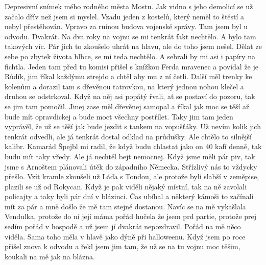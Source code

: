 
Depresivní snímek mého rodného města Mostu. Jak vidno s jeho demolicí
se už začalo dřív než jsem si myslel. Vzadu jeden z kostelů, který
neměl to štěstí a nebyl přestěhován. Vpravo za ruinou budova vojenské
správy. Tam jsem byl u odvodu. Dvakrát. Na dva roky na vojnu se mi
tenkrát fakt nechtělo. A bylo tam takových víc. Pár jich to zkoušelo
uhrát na hlavu, ale do toho jsem nešel. Dělat ze sebe po zbytek života
blbce, se mi teda nechtělo. A sebrali by mi asi i papíry na fichtla.
Jeden tam před tu komisi přišel s knížkou Ferda mravenec a povídal že
je Růdík, jim říkal každýmu strejdo a chtěl aby mu z ní četli. Další
měl trenky ke kolenům a dorazil tam s dřevěnou tatrovkou, na který
jednou nohou klečel a druhou se odstrkoval. Když na něj asi popátý
řvali, ať se postaví do pozoru, tak se jim tam pomočil. Jinej zase
měl dřevěnej samopal a říkal jak moc se těší až bude mít opravdickej a
bude moct všechny postřílet. Taky jim tam jeden vyprávěl, že už se
těší jak bude jezdit s tankem na vopušťáky. Už nevím kolik jich
tenkrát odvedli, ale já tenkrát dostal odklad na průdušky. Ale chtělo
to silnější kalibr. Kamarád Špejbl mi radil, že když budu chlastat
jako on 40 kafí denně, tak budu mít taky vředy. Ale já nechtěl bejt
nemocnej. Když jsme měli pár piv, tak jsme s Arnoštem plánovali útěk
do západního Německa. Střízlivý nás to vždycky přešlo. Vzít kramle
zkoušeli už Láďa s Tondou, ale protože byli slabší v zeměpise,
plazili se už od Rokycan. Když je pak viděli nějaký místní, tak na
ně zavolali policajty a taky byli pár dní v blázinci. Čas ubíhal a
některý kámoši to začínali mít za pár a mně došlo že mě tam stejně
dostanou. Navíc se na mě vykašlala Vendulka, protože do ní její
máma pořád hučela že jsem prd partie, protože prej sedím pořád v
hospodě a už jsem jí dvakrát nepozdravil. Pořád na mě něco viděla.
Sama toho měla v hlavě jako dýně při halloweenu. Když jsem po roce
přišel znova k odvodu a řekl jsem jim tam, že už se na tu vojnu
moc těšim, koukali na mě jak na blázna.

